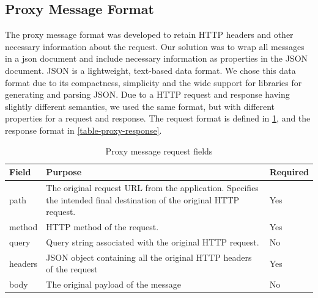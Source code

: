 \subsection{Proxy Message Format}

The proxy message format was developed to retain HTTP headers and other
necessary information about the request. Our solution was to wrap all messages
in a \gls{json} document and include necessary information as properties in the
JSON document. JSON is a lightweight, text-based data format\cite{rfc-json}. We
chose this data format due to its compactness, simplicity and the wide support
for libraries for generating and parsing JSON. Due to a HTTP request and
response having slightly different semantics, we used the same format, but
with different properties for a request and response. The request format is
defined in \cref{table-proxy-request}, and the response format in
\cref{table-proxy-response}.

\begin{table}[h]
\begin{tabularx}{\textwidth}{|l|X|l|}
\hline
\textbf{Field} & \textbf{Purpose}                                                                                                      & \textbf{Required} \\ \hline
path           & The original request URL from the application. Specifies the intended final destination of the original HTTP request. & Yes               \\ \hline
method         & HTTP method of the request.                                                                                           & Yes               \\ \hline
query          & Query string associated with the original HTTP request.                                                               & No                \\ \hline
headers        & JSON object containing all the original HTTP headers of the request                                                   & Yes               \\ \hline
body           & The original payload of the message                                                                                   & No                \\ \hline
\end{tabularx}
\caption{Proxy message request fields}
\label{table-proxy-request}
\end{table}


